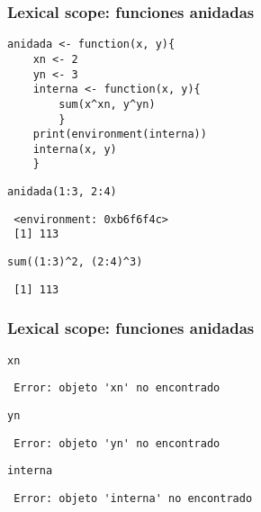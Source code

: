 \documentclass[xcolor={usenames,svgnames,dvipsnames}]{beamer}
\begin{document}
\begin{frame}[fragile]
\frametitle{Lexical scope: funciones anidadas}
\label{sec-2-3}


\lstset{language=R}
\begin{lstlisting}
anidada <- function(x, y){
    xn <- 2
    yn <- 3
    interna <- function(x, y){
        sum(x^xn, y^yn)
        }
    print(environment(interna))
    interna(x, y)
    }
\end{lstlisting}



\lstset{language=R}
\begin{lstlisting}
anidada(1:3, 2:4)
\end{lstlisting}

\begin{verbatim}
 <environment: 0xb6f6f4c>
 [1] 113
\end{verbatim}


\lstset{language=R}
\begin{lstlisting}
sum((1:3)^2, (2:4)^3)
\end{lstlisting}

\begin{verbatim}
 [1] 113
\end{verbatim}
\end{frame}
\begin{frame}[fragile]
\frametitle{Lexical scope: funciones anidadas}
\label{sec-2-4}


\lstset{language=R}
\begin{lstlisting}
xn
\end{lstlisting}

\begin{verbatim}
 Error: objeto 'xn' no encontrado
\end{verbatim}


\lstset{language=R}
\begin{lstlisting}
yn
\end{lstlisting}

\begin{verbatim}
 Error: objeto 'yn' no encontrado
\end{verbatim}


\lstset{language=R}
\begin{lstlisting}
interna
\end{lstlisting}

\begin{verbatim}
 Error: objeto 'interna' no encontrado
\end{verbatim}
\end{frame}
\end{document}
